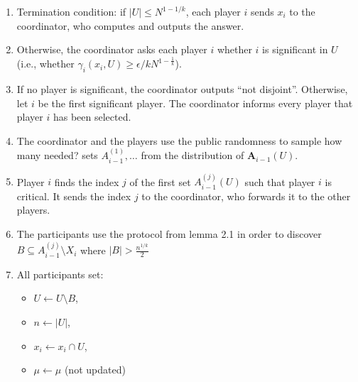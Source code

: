 \documentclass{article}
\newcommand{\eps}{\epsilon}
\newcommand{\TODO}[1]{ {\color{red} #1 }}
\newcommand{\rv}[1]{\mathbf{#1}}
\theoremstyle{plain}
\begin{document}
\begin{enumerate}[(1)]
  \item Termination condition: if $|U| \leq N^{1 - 1/k}$, each player $i$ sends $x_i$ to the coordinator, who computes and outputs the answer. 
  \item Otherwise, the coordinator asks each player $i$ whether $i$ is significant in $U$ (i.e., whether $\gamma_i(x_i, U) \geq \eps / kN^{1-\frac{1}{k}}$).
  \item If no player is significant, the coordinator outputs ``not disjoint''. Otherwise, let $i$ be the
    first significant player. The coordinator informs every player that player $i$ has been selected.
  \item The coordinator and the players use the public randomness to sample \TODO{how many needed?}
    sets $A_{i-1}^{(1)},\ldots$ from the distribution of $\rv{A}_{i-1}(U)$.
  \item Player $i$ finds the index $j$ of the first set $A_{i-1}^{(j)}(U)$ such that player $i$ is critical.
    It sends the index $j$ to the coordinator, who forwards it to the other players.
  \item The participants use the protocol from lemma 2.1 in order to discover $B \subseteq A_{i-1}^{(j)} \setminus X_i $ where $ |B| > \frac{n^{1/k}}{2}$ 
  \item All participants set:
    \begin{itemize}
      \item $U \leftarrow U \setminus B$,
      \item $n \leftarrow |U|$,
      \item $x_i \leftarrow x_i \cap U$,
      \item $\mu \leftarrow \mu $ (not updated)
    \end{itemize}
\end{enumerate}

\end{document}
